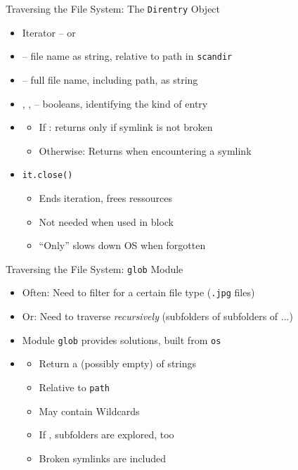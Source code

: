 
\begin{frame}{Traversing the File System: The \texttt{Direntry} Object}
%
\begin{itemize}
\item Iterator --  or 
\item {} -- file name as string, relative to path in \texttt{scandir}
\item {} -- full file name, including path, as string
\item {}, ,  -- booleans, identifying the kind of entry
\item {}
	\begin{itemize}
	\item If : returns  only if symlink is not broken
	\item Otherwise: Returns  when encountering a symlink
	\end{itemize}
\item \texttt{it.close()}
	\begin{itemize}
	\item Ends iteration, frees ressources
	\item Not needed when used in  block
	\item \enquote{Only} slows down OS when forgotten
	\end{itemize}
\end{itemize}
%
\end{frame}


\begin{frame}{Traversing the File System: \texttt{glob} Module}
%
\begin{itemize}
\item Often: Need to filter for a certain file type (\eg \texttt{.jpg} files)
\item Or: Need to traverse \emph{recursively} (subfolders of subfolders of ...)
\item[\Thus] Module \texttt{glob} provides solutions, built from \texttt{os}
\item {}
	\begin{itemize}
	\item Return a (possibly empty)  of strings
	\item Relative to \texttt{path}
	\item May contain Wildcards
	\item If , subfolders are explored, too
	\item Broken symlinks are included
	\end{itemize}
\end{itemize}
%
\end{frame}

